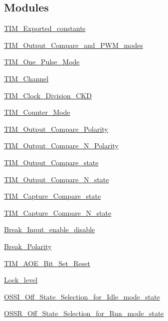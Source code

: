\subsection*{Modules}
\begin{DoxyCompactItemize}
\item 
\hyperlink{group__TIM__Exported__constants}{TIM\_\-Exported\_\-constants}
\item 
\hyperlink{group__TIM__Output__Compare__and__PWM__modes}{TIM\_\-Output\_\-Compare\_\-and\_\-PWM\_\-modes}
\item 
\hyperlink{group__TIM__One__Pulse__Mode}{TIM\_\-One\_\-Pulse\_\-Mode}
\item 
\hyperlink{group__TIM__Channel}{TIM\_\-Channel}
\item 
\hyperlink{group__TIM__Clock__Division__CKD}{TIM\_\-Clock\_\-Division\_\-CKD}
\item 
\hyperlink{group__TIM__Counter__Mode}{TIM\_\-Counter\_\-Mode}
\item 
\hyperlink{group__TIM__Output__Compare__Polarity}{TIM\_\-Output\_\-Compare\_\-Polarity}
\item 
\hyperlink{group__TIM__Output__Compare__N__Polarity}{TIM\_\-Output\_\-Compare\_\-N\_\-Polarity}
\item 
\hyperlink{group__TIM__Output__Compare__state}{TIM\_\-Output\_\-Compare\_\-state}
\item 
\hyperlink{group__TIM__Output__Compare__N__state}{TIM\_\-Output\_\-Compare\_\-N\_\-state}
\item 
\hyperlink{group__TIM__Capture__Compare__state}{TIM\_\-Capture\_\-Compare\_\-state}
\item 
\hyperlink{group__TIM__Capture__Compare__N__state}{TIM\_\-Capture\_\-Compare\_\-N\_\-state}
\item 
\hyperlink{group__Break__Input__enable__disable}{Break\_\-Input\_\-enable\_\-disable}
\item 
\hyperlink{group__Break__Polarity}{Break\_\-Polarity}
\item 
\hyperlink{group__TIM__AOE__Bit__Set__Reset}{TIM\_\-AOE\_\-Bit\_\-Set\_\-Reset}
\item 
\hyperlink{group__Lock__level}{Lock\_\-level}
\item 
\hyperlink{group__OSSI__Off__State__Selection__for__Idle__mode__state}{OSSI\_\-Off\_\-State\_\-Selection\_\-for\_\-Idle\_\-mode\_\-state}
\item 
\hyperlink{group__OSSR__Off__State__Selection__for__Run__mode__state}{OSSR\_\-Off\_\-State\_\-Selection\_\-for\_\-Run\_\-mode\_\-state}

\end{DoxyCompactItemize}
